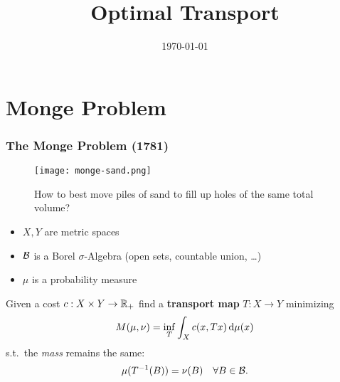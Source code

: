 \documentclass{beamer}
\title{Optimal Transport}
\date{\today}
\begin{document}
\maketitle
\frame{\tableofcontents}

\section{Monge Problem}%
\label{sec:}

\begin{frame}
  \frametitle{The Monge Problem (1781)}

  \begin{minipage}{0.5\textwidth}
    \begin{figure}[ht]
      \centering
      \texttt{[image: monge-sand.png]}
      \caption{How to best move piles of sand to fill up holes of the same total volume?\label{fig:label} }
    \end{figure}
  \end{minipage}
  \hfill
  \begin{minipage}{0.45\textwidth}
    \begin{itemize}
      \item $X,Y$ are metric spaces
      \item $\mathcal{B}$ is a Borel $\sigma$-Algebra (open sets, countable union, \dots)
      \item $\mu$ is a probability measure
    \end{itemize}
  Given a cost $c: X\times Y \to \mathbb{R}_+$ find a \textbf{transport map} $T: X \to Y$ minimizing
  \begin{equation}
    M(\mu, \nu) = \inf_T \int_X c(x, Tx) \mathop{}\!\mathrm{d} \mu(x)
  \end{equation}
  s.t.\ the \emph{mass} remains the same:
  \begin{equation}
    \mu(T^{-1}(B)) = \nu(B) \quad \forall B \in \mathcal{B}.
  \end{equation}
  \end{minipage}
\end{frame}
\end{document}
